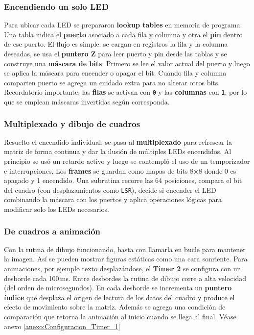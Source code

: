 \subsubsection{Encendiendo un solo LED}
Para ubicar cada LED se prepararon \textbf{lookup tables} en memoria de programa. Una tabla indica el \textbf{puerto} asociado a cada fila y columna y otra el \textbf{pin} dentro de ese puerto. El flujo es simple: se cargan en registros la fila y la columna deseadas, se usa el \textbf{puntero Z} para leer puerto y pin desde las tablas y se construye una \textbf{máscara de bits}. Primero se lee el valor actual del puerto y luego se aplica la máscara para encender o apagar el bit. Cuando fila y columna comparten puerto se agrega un cuidado extra para no alterar otros bits. Recordatorio importante: las \textbf{filas} se activan con \texttt{0} y las \textbf{columnas} con \texttt{1}, por lo que se emplean máscaras invertidas según corresponda.

\subsubsection{Multiplexado y dibujo de cuadros}
Resuelto el encendido individual, se pasa al \textbf{multiplexado} para refrescar la matriz de forma continua y dar la ilusión de múltiples LEDs encendidos. Al principio se usó un retardo activo y luego se contempló el uso de un temporizador e interrupciones. Los \textbf{frames} se guardan como mapas de bits 8×8 donde 0 es apagado y 1 encendido. Una subrutina recorre las 64 posiciones, compara el bit del cuadro (con desplazamientos como \texttt{LSR}), decide si encender el LED combinando la máscara con los puertos y aplica operaciones lógicas para modificar solo los LEDs necesarios.

\subsubsection{De cuadros a animación}
Con la rutina de dibujo funcionando, basta con llamarla en bucle para mantener la imagen. Así se pueden mostrar figuras estáticas como una cara sonriente. Para animaciones, por ejemplo texto desplazándose, el \textbf{Timer 2} se configura con un desborde cada 100\,ms. Entre desbordes la rutina de dibujo corre a alta velocidad (del orden de microsegundos). En cada desborde se incrementa un \textbf{puntero índice} que desplaza el origen de lectura de los datos del cuadro y produce el efecto de movimiento sobre la matriz. Además se agrega una condición de comparación que retorna la animación al inicio cuando se llega al final. Véase anexo \ref{anexo:Configuracion_Timer_1}


